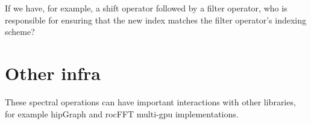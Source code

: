 \documentclass[12pt]{article}
\renewcommand{\(}{\left(}
\renewcommand{\)}{\right)}
\begin{document}
If we have, for example, a shift operator followed by a filter
operator, who is responsible for ensuring that the new index matches
the filter operator's indexing scheme?

\section{Other infra}

These spectral operations can have important interactions with other
libraries, for example hipGraph and rocFFT multi-gpu implementations.
\end{document}
